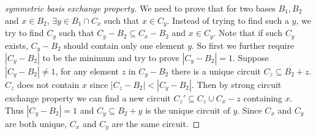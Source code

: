 \begin{proof}[symmetric basis exchange property]\label{prf:sym_base_exchange}
We need to prove that for two bases $B_1,B_2$ and $x\in B_2$, $\exists y\in B_1\cap C_x$ such that $x\in C_y$. Instead of trying to find such a $y$, we try to find $C_y$ such that $C_y-B_2\subseteq C_x-B_2$ and $x\in C_y$. Note that if such $C_y$ exists, $C_y -B_2$ should contain only one element $y$. So first we further require $|C_y-B_2|$ to be the minimum and try to prove $|C_y-B_2|=1$. Suppose $|C_y-B_2|\not =1$, for any element $z$ in $C_y-B_2$ there is a unique circuit $C_z\subseteq B_2+z$. $C_z$ does not contain $x$ since $|C_z-B_2|<|C_y-B_2|$. Then by strong circuit exchange property we can find a new circuit $C_z'\subseteq C_z\cup C_x-z$ containing $x$. Thus $|C_y-B_2|=1$ and $C_y\subseteq B_2+y$ is the unique circuit of $y$. Since $C_x$ and $C_y$ are both unique, $C_x$ and $C_y$ are the same circuit.
\end{proof}

